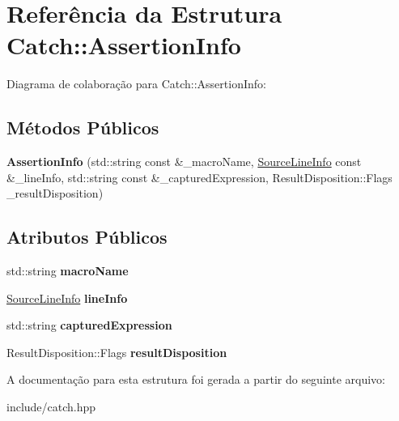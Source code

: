 \hypertarget{structCatch_1_1AssertionInfo}{}\section{Referência da Estrutura Catch\+:\+:Assertion\+Info}
\label{structCatch_1_1AssertionInfo}


Diagrama de colaboração para Catch\+:\+:Assertion\+Info\+:
\subsection*{Métodos Públicos}
\begin{DoxyCompactItemize}
\item 
{\bfseries Assertion\+Info} (std\+::string const \&\+\_\+macro\+Name, \hyperlink{structCatch_1_1SourceLineInfo}{Source\+Line\+Info} const \&\+\_\+line\+Info, std\+::string const \&\+\_\+captured\+Expression, Result\+Disposition\+::\+Flags \+\_\+result\+Disposition)\hypertarget{structCatch_1_1AssertionInfo_aaf6cc3eebd40391e54d37ed42953c73f}{}\label{structCatch_1_1AssertionInfo_aaf6cc3eebd40391e54d37ed42953c73f}

\end{DoxyCompactItemize}
\subsection*{Atributos Públicos}
\begin{DoxyCompactItemize}
\item 
std\+::string {\bfseries macro\+Name}\hypertarget{structCatch_1_1AssertionInfo_ac2e59e8c89e00eb3390768f50d540b18}{}\label{structCatch_1_1AssertionInfo_ac2e59e8c89e00eb3390768f50d540b18}

\item 
\hyperlink{structCatch_1_1SourceLineInfo}{Source\+Line\+Info} {\bfseries line\+Info}\hypertarget{structCatch_1_1AssertionInfo_a17bdbb404ba12658034f833be2f4c3e7}{}\label{structCatch_1_1AssertionInfo_a17bdbb404ba12658034f833be2f4c3e7}

\item 
std\+::string {\bfseries captured\+Expression}\hypertarget{structCatch_1_1AssertionInfo_af7c1d3cbfa346e9a303030fa0ef0cb54}{}\label{structCatch_1_1AssertionInfo_af7c1d3cbfa346e9a303030fa0ef0cb54}

\item 
Result\+Disposition\+::\+Flags {\bfseries result\+Disposition}\hypertarget{structCatch_1_1AssertionInfo_a60353b3632ab2f827162f2b2d6911073}{}\label{structCatch_1_1AssertionInfo_a60353b3632ab2f827162f2b2d6911073}

\end{DoxyCompactItemize}


A documentação para esta estrutura foi gerada a partir do seguinte arquivo\+:\begin{DoxyCompactItemize}
\item 
include/catch.\+hpp\end{DoxyCompactItemize}
